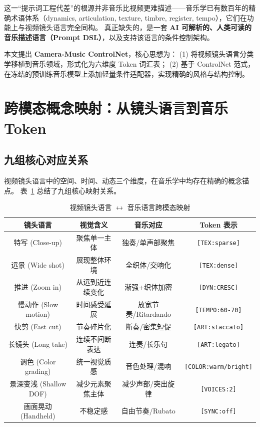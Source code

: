 \documentclass[12pt,a4paper]{article}
\begin{document}
这一“提示词工程代差”的根源并非音乐比视频更难描述——音乐学已有数百年的精确术语体系（dynamics, articulation, texture, timbre, register, tempo），它们在功能上与视频镜头语言完全同构。
真正缺失的，是一套 \textbf{AI 可解析的、人类可读的音乐描述语言（Prompt DSL）}，以及支持该语言的条件控制架构。

本文提出 \textbf{Camera-Music ControlNet}，核心思想为：
(1) 将视频镜头语言分类学移植到音乐领域，形式化为六维度 Token 词汇表；
(2) 基于 ControlNet 范式，在冻结的预训练音乐模型上添加轻量条件适配器，实现精确的风格与结构控制。

\section{跨模态概念映射：从镜头语言到音乐 Token}

\subsection{九组核心对应关系}

视频镜头语言中的空间、时间、动态三个维度，在音乐学中均存在精确的概念锚点。
表~\ref{tab:mapping} 总结了九组核心映射关系。

\begin{table}[H]
\centering
\caption{视频镜头语言 $\leftrightarrow$ 音乐语言跨模态映射}
\label{tab:mapping}
\begin{tabular}{c|c|c|c}
\toprule
\textbf{镜头语言} & \textbf{视觉含义} & \textbf{音乐对应} & \textbf{Token 表示} \\
\midrule
特写 (Close-up) & 聚焦单一主体 & 独奏/单声部聚焦 & \texttt{[TEX:sparse]} \\
远景 (Wide shot) & 展现整体环境 & 全织体/交响化 & \texttt{[TEX:dense]} \\
推进 (Zoom in) & 从远到近连续变化 & 渐强+织体加密 & \texttt{[DYN:CRESC]} \\
慢动作 (Slow motion) & 时间感受延展 & 放宽节奏/Ritardando & \texttt{[TEMPO:60-70]} \\
快剪 (Fast cut) & 节奏碎片化 & 断奏/密集短促 & \texttt{[ART:staccato]} \\
长镜头 (Long take) & 连续不间断表达 & 连奏/长乐句 & \texttt{[ART:legato]} \\
调色 (Color grading) & 统一视觉质感 & 音色处理/混响 & \texttt{[COLOR:warm/bright]} \\
景深变浅 (Shallow DOF) & 减少元素聚焦主体 & 减少声部/突出旋律 & \texttt{[VOICES:2]} \\
画面晃动 (Handheld) & 不稳定感 & 自由节奏/Rubato & \texttt{[SYNC:off]} \\
\bottomrule
\end{tabular}
\end{table}
\end{document}
